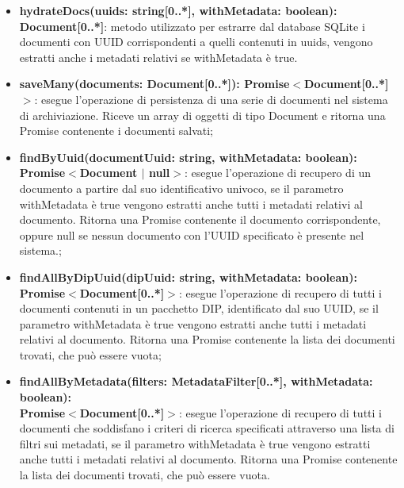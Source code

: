 \documentclass[a4paper,12pt]{article}
\begin{document}
{{{\begin{itemize}
                    \item \textbf{hydrateDocs(uuids: string[0..*], withMetadata: boolean): Document[0..*]}: metodo utilizzato per estrarre dal database SQLite i documenti con UUID corrispondenti a quelli contenuti in uuids, vengono estratti anche i metadati relativi se withMetadata è true. 
                    \item \textbf{saveMany(documents: Document[0..*]): Promise$<$Document[0..*]$>$}: esegue l'operazione di persistenza di una serie di documenti nel sistema di archiviazione. Riceve un array di oggetti di tipo Document e ritorna una Promise contenente i documenti salvati;
                    \item \textbf{findByUuid(documentUuid: string, withMetadata: boolean):\\ Promise$<$Document $|$ null$>$}: esegue l'operazione di recupero di un documento a partire dal suo identificativo univoco, se il parametro withMetadata è true vengono estratti anche tutti i metadati relativi al documento. Ritorna una Promise contenente il documento corrispondente, oppure null se nessun documento con l'UUID specificato è presente nel sistema.;
                    \item \textbf{findAllByDipUuid(dipUuid: string, withMetadata: boolean):\\ Promise$<$Document[0..*]$>$}: esegue l'operazione di recupero di tutti i documenti contenuti in un pacchetto DIP, identificato dal suo UUID, se il parametro withMetadata è true vengono estratti anche tutti i metadati relativi al documento. Ritorna una Promise contenente la lista dei documenti trovati, che può essere vuota;
                    \item \textbf{findAllByMetadata(filters: MetadataFilter[0..*], withMetadata: boolean):\\ Promise$<$Document[0..*]$>$}: esegue l'operazione di recupero di tutti i documenti che soddisfano i criteri di ricerca specificati attraverso una lista di filtri sui metadati, se il parametro withMetadata è true vengono estratti anche tutti i metadati relativi al documento. Ritorna una Promise contenente la lista dei documenti trovati, che può essere vuota.
                \end{itemize}
}}}
\end{document}

